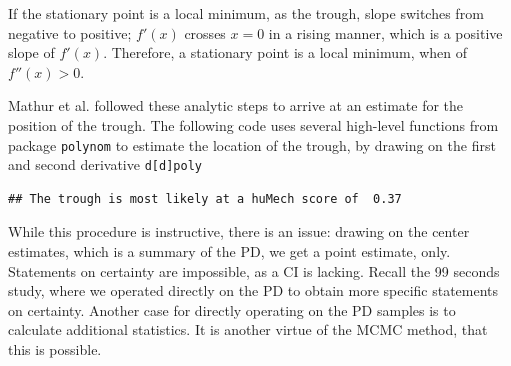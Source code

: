 \documentclass[]{svmono}
\newenvironment{Shaded}{\begin{snugshade}}{\end{snugshade}}
\newcommand{\KeywordTok}[1]{\textcolor[rgb]{0.13,0.29,0.53}{\textbf{#1}}}
\newcommand{\DecValTok}[1]{\textcolor[rgb]{0.00,0.00,0.81}{#1}}
\newcommand{\StringTok}[1]{\textcolor[rgb]{0.31,0.60,0.02}{#1}}
\newcommand{\CommentTok}[1]{\textcolor[rgb]{0.56,0.35,0.01}{\textit{#1}}}
\newcommand{\OperatorTok}[1]{\textcolor[rgb]{0.81,0.36,0.00}{\textbf{#1}}}
\newcommand{\NormalTok}[1]{#1}
\theoremstyle{definition}
\theoremstyle{definition}
\theoremstyle{definition}
\theoremstyle{remark}
\begin{document}
If the stationary point is a local minimum, as the trough, slope
switches from negative to positive; \(f'(x)\) crosses \(x = 0\) in a
rising manner, which is a positive slope of \(f'(x)\). Therefore, a
stationary point is a local minimum, when of \(f''(x) > 0\).

Mathur et al. followed these analytic steps to arrive at an estimate for
the position of the trough. The following code uses several high-level
functions from package \texttt{polynom} to estimate the location of the
trough, by drawing on the first and second derivative
\texttt{d{[}d{]}poly}

\begin{Shaded}
\end{Shaded}

\begin{verbatim}
## The trough is most likely at a huMech score of  0.37
\end{verbatim}

While this procedure is instructive, there is an issue: drawing on the
center estimates, which is a summary of the PD, we get a point estimate,
only. Statements on certainty are impossible, as a CI is lacking. Recall
the 99 seconds study, where we operated directly on the PD to obtain
more specific statements on certainty. Another case for directly
operating on the PD samples is to calculate additional statistics. It is
another virtue of the MCMC method, that this is possible.
\end{document}
